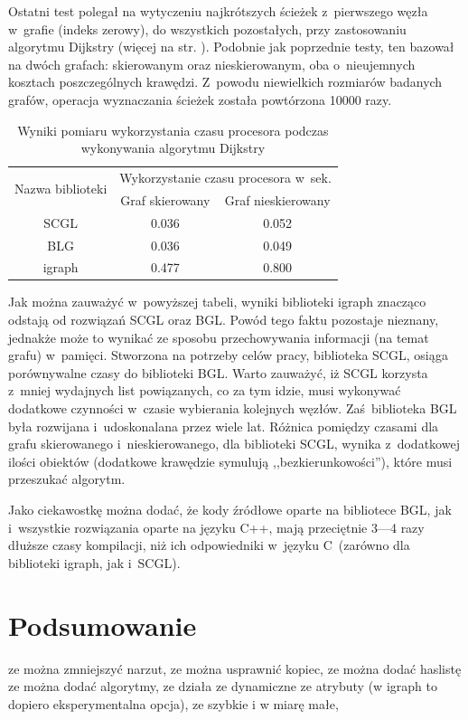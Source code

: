 \documentclass[a4paper,12pt,polish,oneside]{thesis}
\begin{document}
Ostatni test polegał na wytyczeniu najkrótszych ścieżek z~pierwszego węzła w~grafie (indeks zerowy), do wszystkich pozostałych, przy zastosowaniu algorytmu Dijkstry (więcej na str. \pageref{chap:dijkstra}).
Podobnie jak poprzednie testy, ten bazował na dwóch grafach: skierowanym oraz nieskierowanym, oba o~nieujemnych kosztach poszczególnych krawędzi. %
Z~powodu niewielkich rozmiarów badanych grafów, operacja wyznaczania ścieżek została powtórzona 10000 razy.

\begin{table}[htb]
\caption{Wyniki pomiaru wykorzystania czasu procesora podczas wykonywania algorytmu Dijkstry}
\label{tab:dijkstra}
\centering
\begin{tabular}{ | c | c | c | }
	\hline
	\multirow{2}{*}{Nazwa biblioteki } & \multicolumn{2}{|c|}{Wykorzystanie czasu procesora w~sek.} \\
	\cline{2-3}
		& Graf skierowany & Graf nieskierowany \\
	\hline \hline
	SCGL    & 0.036 & 0.052 \\ \hline
	BLG     & 0.036 & 0.049 \\ \hline
	igraph  & 0.477 & 0.800 \\ \hline
\end{tabular}
\end{table}
Jak można zauważyć w~powyższej tabeli, wyniki biblioteki igraph znacząco odstają od rozwiązań SCGL oraz BGL.
Powód tego faktu pozostaje nieznany, jednakże może to wynikać ze sposobu przechowywania informacji (na temat grafu) w~pamięci.
Stworzona na potrzeby celów pracy, biblioteka SCGL, osiąga porównywalne czasy do biblioteki BGL.
Warto zauważyć, iż SCGL korzysta z~mniej wydajnych list powiązanych, co za tym idzie, musi wykonywać dodatkowe czynności w~czasie wybierania kolejnych węzłów.
Zaś~biblioteka BGL była rozwijana i~udoskonalana przez wiele lat.
Różnica pomiędzy czasami dla grafu skierowanego i~nieskierowanego, dla biblioteki SCGL, wynika z~dodatkowej ilości obiektów (dodatkowe krawędzie symulują ,,bezkierunkowości''), które musi przeszukać algorytm.

Jako ciekawostkę można dodać, że kody źródłowe oparte na bibliotece BGL, jak i~wszystkie rozwiązania oparte na języku C++, mają przeciętnie 3---4 razy dłuższe czasy kompilacji, niż ich odpowiedniki w~języku C~(zarówno dla biblioteki igraph, jak i~SCGL).

\chapter*{Podsumowanie}
ze można zmniejszyć narzut, ze można usprawnić kopiec, ze można dodać haslistę  ze można dodać algorytmy, 
   ze działa ze dynamiczne ze atrybuty (w igraph to dopiero eksperymentalna opcja), ze szybkie i w miarę małe, 
\end{document}
